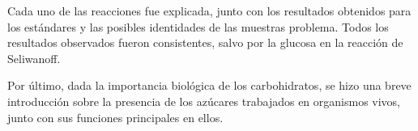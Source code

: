 \documentclass[fleqn,10pt]{SelfArx}
\begin{document}
	Cada uno de las reacciones fue explicada, junto con los resultados obtenidos para los est\'andares y las posibles identidades de las muestras problema. Todos los resultados observados fueron consistentes, salvo por la glucosa en la reacci\'on de Seliwanoff.
	
	Por \'ultimo, dada la importancia biol\'ogica de los carbohidratos, se hizo una breve introducci\'on sobre la presencia de los az\'ucares trabajados en organismos vivos, junto con sus funciones principales en ellos.



\end{document}
